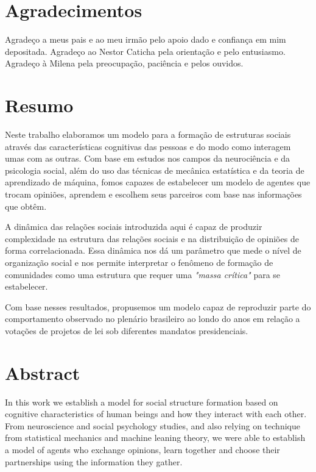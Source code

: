 \documentclass[nobib,a4,twosided,justified]{tufte-book}
\newcommand{\blankpage}{\newpage\hbox{}\thispagestyle{empty}\newpage}
\begin{document}
\chapter*{Agradecimentos}

Agradeço a meus pais e ao meu irmão pelo apoio dado e confiança em mim depositada.
Agradeço ao Nestor Caticha pela orientação e pelo entusiasmo.
Agradeço à Milena pela preocupação, paciência e pelos ouvidos.
\blankpage

\chapter*{Resumo}

Neste trabalho elaboramos um modelo para a formação de estruturas sociais através das características cognitivas das pessoas e do modo como interagem umas com as outras.
Com base em estudos nos campos da neurociência e da psicologia social, além do uso das técnicas de mecânica estatística e da teoria de aprendizado de máquina, fomos capazes de estabelecer um modelo de agentes que trocam opiniões, aprendem e escolhem seus parceiros com base nas informações que obtêm.

A dinâmica das relações sociais introduzida aqui é capaz de produzir complexidade na estrutura das relações sociais e na distribuição de opiniões de forma correlacionada.
Essa dinâmica nos dá um parâmetro que mede o nível de organização social e nos permite interpretar o fenômeno de formação de comunidades como uma estrutura que requer uma \emph{"massa crítica"} para se estabelecer.

Com base nesses resultados, propusemos um modelo capaz de reproduzir parte do comportamento observado no plenário brasileiro ao londo do anos em relação a votações de projetos de lei sob diferentes mandatos presidenciais.

\chapter*{Abstract}

In this work we establish a model for social structure formation based on cognitive characteristics of human beings and how they interact with each other.
From neuroscience and social psychology studies, and also relying on technique from statistical mechanics and machine leaning theory, we were able to establish a model of agents who exchange opinions, learn together and choose their partnerships using the information they gather.
\end{document}
